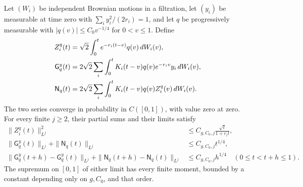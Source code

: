 \begin{lemma}\label{entr:stochastic-kernels}
Let \((W_i)\) be independent Brownian motions in a filtration, let
\((y_i)\) be measurable at time zero with
\(\sum_i y_i^2/(2r_i)=1\), and let \(q\) be progressively measurable
with \(|q(v)|\le C_0v^{-1/4}\) for \(0<v\le1\).  Define
\begin{align}
 Z_i^q(t)&=\sqrt2\int_0^t e^{-r_i(t-v)}q(v)\,dW_i(v),\notag\\
 \mathsf G_q^y(t)&=2\sqrt2\sum_i\int_0^t
                K_i(t-v)q(v)e^{-r_iv}y_i\,dW_i(v),\label{entr:stochastic-parts}\\
 \mathsf N_q(t)&=2\sqrt2\sum_i\int_0^t
                K_i(t-v)q(v)Z_i^q(v)\,dW_i(v).\notag
\end{align}
The two series converge in probability in \(C([0,1])\), with value
zero at zero.  For every finite \(j\ge2\), their partial sums and their
limits satisfy
\begin{align}
 \|Z_i^q(t)\|_{L^j}^2
     &\le C_{g,C_0,j}\frac{\sqrt t}{1+r_it},           \label{entr:Z-moment}\\
 \|\mathsf G_q^y(t)\|_{L^j}+\|\mathsf N_q(t)\|_{L^j}
     &\le C_{g,C_0,j}t^{1/4},                         \label{entr:stoch-moment}\\
 \|\mathsf G_q^y(t+h)-\mathsf G_q^y(t)\|_{L^j}
  +\|\mathsf N_q(t+h)-\mathsf N_q(t)\|_{L^j}
     &\le C_{g,C_0,j}h^{1/4}\quad(0\le t<t+h\le1).
                                                               \label{entr:stoch-increment}
\end{align}
The supremum on \([0,1]\) of either limit has every finite moment,
bounded by a constant depending only on \(g,C_0\), and that order.
\end{lemma}

